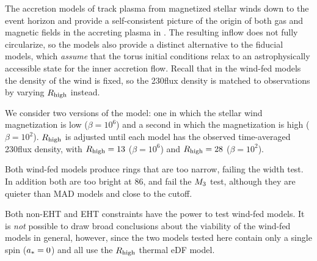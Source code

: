 The accretion models of \cite{2020ApJ...896L...6R, 2020MNRAS.492.3272R, 2018MNRAS.478.3544R} track plasma from  magnetized stellar winds down to the event horizon and provide a self-consistent picture of the origin of both gas and magnetic fields in the accreting plasma in \sgra.
The resulting inflow does not fully circularize, so the models also provide a distinct alternative to the fiducial models, which {\em assume} that the torus initial conditions relax to an astrophysically accessible state for the inner accretion flow.
Recall that in the wind-fed models the density of the wind is fixed, so the 230\GHz flux density is matched to observations by varying $R_\mathrm{high}$ instead.

We consider two versions of the model: one in which the stellar wind magnetization is low ($\beta = 10^6$) and a second in which the magnetization is high ($\beta = 10^2$).
$R_\mathrm{high}$ is adjusted until each model has the observed time-averaged 230\GHz flux density, with $R_\mathrm{high} = 13$ ($\beta = 10^6$) and $R_\mathrm{high} = 28$ ($\beta = 10^2$).

Both wind-fed models produce rings that are too narrow, failing the \mring width test.
In addition both are too bright at 86\GHz, and fail the $M_{3}$ test, although they are quieter than MAD models and close to the cutoff.

Both non-EHT and EHT constraints have the power to test wind-fed models.
It is {\em not} possible to draw broad conclusions about the viability of the wind-fed models in general, however, since the two models tested here contain only a single spin ($a_*=0$) and all use the $R_\mathrm{high}$ thermal eDF model.
